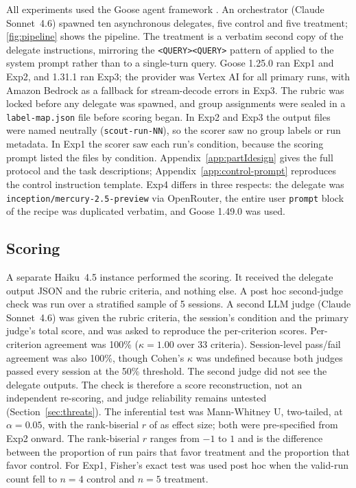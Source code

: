 \documentclass[11pt,a4paper]{article}
\begin{document}
All experiments used the Goose agent framework \citep{goose}.
An orchestrator (Claude Sonnet~4.6) spawned ten asynchronous delegates, five control and five treatment; \autoref{fig:pipeline} shows the pipeline.
The treatment is a verbatim second copy of the delegate instructions, mirroring the \texttt{<QUERY><QUERY>} pattern of \citet{leviathan2025} applied to the system prompt rather than to a single-turn query.
Goose 1.25.0 ran Exp1 and Exp2, and 1.31.1 ran Exp3; the provider was Vertex AI for all primary runs, with Amazon Bedrock as a fallback for stream-decode errors in Exp3.
The rubric was locked before any delegate was spawned, and group assignments were sealed in a \texttt{label-map.json} file before scoring began.
In Exp2 and Exp3 the output files were named neutrally (\texttt{scout-run-NN}), so the scorer saw no group labels or run metadata.
In Exp1 the scorer saw each run's condition, because the scoring prompt listed the files by condition.
Appendix~\ref{app:partIdesign} gives the full protocol and the task descriptions; Appendix~\ref{app:control-prompt} reproduces the control instruction template.
Exp4 differs in three respects: the delegate was \texttt{inception/mercury-2.5-preview} via OpenRouter, the entire user \texttt{prompt} block of the recipe was duplicated verbatim, and Goose 1.49.0 was used.

\subsection{Scoring}
\label{subsec:scoring-validation}

A separate Haiku~4.5 instance performed the scoring.
It received the delegate output JSON and the rubric criteria, and nothing else.
A post hoc second-judge check was run over a stratified sample of 5 sessions.
A second LLM judge (Claude Sonnet~4.6) was given the rubric criteria, the session's condition and the primary judge's total score, and was asked to reproduce the per-criterion scores.
Per-criterion agreement was 100\% ($\kappa = 1.00$ over 33 criteria).
Session-level pass/fail agreement was also 100\%, though Cohen's $\kappa$ was undefined because both judges passed every session at the 50\% threshold.
The second judge did not see the delegate outputs.
The check is therefore a score reconstruction, not an independent re-scoring, and judge reliability remains untested (Section~\ref{sec:threats}).
The inferential test was Mann-Whitney U, two-tailed, at $\alpha{=}0.05$, with the rank-biserial $r$ of \citet{kerby2014} as effect size; both were pre-specified from Exp2 onward.
The rank-biserial $r$ ranges from $-1$ to $1$ and is the difference between the proportion of run pairs that favor treatment and the proportion that favor control.
For Exp1, Fisher's exact test was used post hoc when the valid-run count fell to $n{=}4$ control and $n{=}5$ treatment.
\end{document}

